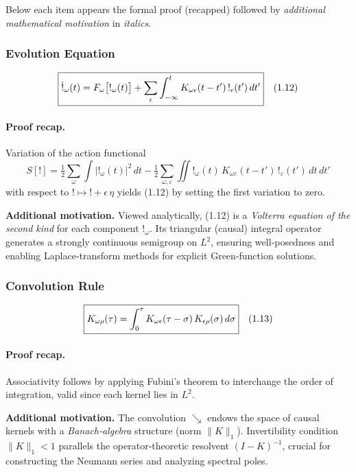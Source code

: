 \medskip
Below each item appears the formal proof (recapped) followed by \emph{additional mathematical motivation} in \textit{italics}.

\medskip
\subsubsection{Evolution Equation}
\[
  \boxed{%
  \dot{!}_{\omega}(t)
  = F_{\omega}\bigl[!_{\omega}(t)\bigr]
    + \sum_{\epsilon}
      \int_{-\infty}^{t}
        K_{\omega\epsilon}(t-t')\,!_{\epsilon}(t')\,dt'
  }\quad(1.12)
\]

\paragraph{Proof recap.}  
Variation of the action functional
\[
  S[!]
  = \tfrac12\sum_{\omega}\int |!_{\omega}(t)|^{2}\,dt
    - \tfrac12\sum_{\omega,\varepsilon}
      \iint !_{\omega}(t)\,K_{\omega\varepsilon}(t-t')\,!_{\varepsilon}(t')\,dt\,dt'
  \tag{1.15}
\]
with respect to \( ! \mapsto ! + \epsilon\,\eta\) yields (1.12) by setting the first variation to zero.

\begin{concept}
\textbf{Additional motivation.} Viewed analytically, (1.12) is a \emph{Volterra equation of the second kind} for each component \(!_{\omega}\).  Its triangular (causal) integral operator generates a strongly continuous semigroup on \(L^{2}\), ensuring well‐posedness and enabling Laplace‐transform methods for explicit Green‐function solutions.
\end{concept}

\medskip

\subsubsection{Convolution Rule}
\[
  \boxed{%
  K_{\omega\rho}(\tau)
  = \int_{0}^{\tau}
      K_{\omega\epsilon}(\tau-\sigma)\,K_{\epsilon\rho}(\sigma)\,d\sigma
  }\quad(1.13)
\]

\paragraph{Proof recap.}  
Associativity follows by applying Fubini’s theorem to interchange the order of integration, valid since each kernel lies in \(L^{2}\).

\begin{concept}
\textbf{Additional motivation.} The convolution \(↘\) endows the space of causal kernels with a \emph{Banach‐algebra} structure (norm \(\|K\|_{1}\)).  Invertibility condition \(\|K\|_{1}<1\) parallels the operator‐theoretic resolvent \((I-K)^{-1}\), crucial for constructing the Neumann series and analyzing spectral poles.
\end{concept}

